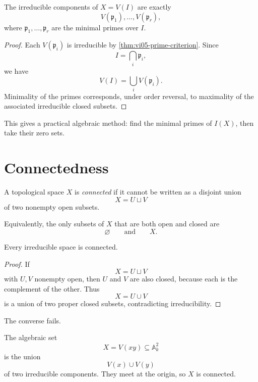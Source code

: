 \begin{theorem}
\label{thm:vi05-minimal-primes}
The irreducible components of \(X=V(I)\) are exactly
\[
V(\mathfrak p_1),\dots,V(\mathfrak p_r),
\]
where \(\mathfrak p_1,\dots,\mathfrak p_r\) are the minimal primes over \(I\).
\end{theorem}

\begin{proof}
Each \(V(\mathfrak p_i)\) is irreducible by
\cref{thm:vi05-prime-criterion}.  Since
\[
I=\bigcap_i\mathfrak p_i,
\]
we have
\[
V(I)=\bigcup_iV(\mathfrak p_i).
\]
Minimality of the primes corresponds, under order reversal, to maximality of the associated
irreducible closed subsets.
\end{proof}

This gives a practical algebraic method: find the minimal primes of \(I(X)\), then take their
zero sets.



\section{Connectedness}

\begin{definition}
A topological space \(X\) is \emph{connected} if it cannot be written as a disjoint union
\[
X=U\sqcup V
\]
of two nonempty open subsets.
\end{definition}

Equivalently, the only subsets of \(X\) that are both open and closed are
\[
\varnothing
\qquad\text{and}\qquad
X.
\]

\begin{proposition}
\label{prop:vi05-irreducible-connected}
Every irreducible space is connected.
\end{proposition}

\begin{proof}
If
\[
X=U\sqcup V
\]
with \(U,V\) nonempty open, then \(U\) and \(V\) are also closed, because each is the
complement of the other.  Thus
\[
X=U\cup V
\]
is a union of two proper closed subsets, contradicting irreducibility.
\end{proof}

The converse fails.

\begin{example}
The algebraic set
\[
X=V(xy)\subseteq\mathbb A_k^2
\]
is the union
\[
V(x)\cup V(y)
\]
of two irreducible components.  They meet at the origin, so \(X\) is connected.
\end{example}

